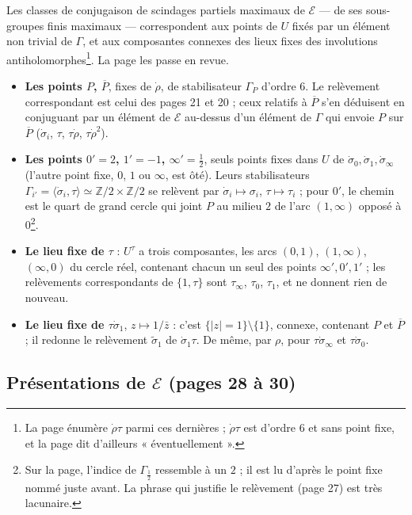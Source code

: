 \documentclass[11pt,a4paper]{article}
\begin{document}
Les classes de conjugaison de scindages partiels maximaux de $\mathcal{E}$ —
de ses sous-groupes finis maximaux — correspondent aux points de $U$ fixés par
un élément non trivial de $\Gamma$, et aux composantes connexes des lieux fixes
des involutions antiholomorphes\footnote{La page énumère $\dot\rho\tau$ parmi
ces dernières ; $\dot\rho\tau$ est d'ordre $6$ et sans point fixe, et la page
dit d'ailleurs « éventuellement ».}. La page les passe en revue.

\begin{itemize}
\item \textbf{Les points $P$, $\overline{P}$}, fixes de $\dot\rho$, de
stabilisateur $\Gamma_P$ d'ordre $6$. Le relèvement correspondant est celui des
pages 21 et 20 ; ceux relatifs à $\overline{P}$ s'en déduisent en conjuguant par
un élément de $\mathcal{E}$ au-dessus d'un élément de $\Gamma$ qui envoie $P$
sur $\overline{P}$ ($\dot\sigma_i$, $\tau$, $\tau\dot\rho$, $\tau\dot\rho^2$).
\item \textbf{Les points $0' = 2$, $1' = -1$, $\infty' = \frac12$}, seuls points
fixes dans $U$ de $\dot\sigma_0, \dot\sigma_1, \dot\sigma_\infty$ (l'autre point
fixe, $0$, $1$ ou $\infty$, est ôté). Leurs stabilisateurs $\Gamma_{i'} =
\langle \dot\sigma_i, \tau\rangle \simeq \mathbb{Z}/2 \times \mathbb{Z}/2$ se
relèvent par $\dot\sigma_i \mapsto \sigma_i$, $\tau \mapsto \tau_i$ ; pour
$0'$, le chemin est le quart de grand cercle qui joint $P$ au milieu $2$ de
l'arc $(1, \infty)$ opposé à $0$\footnote{Sur la page, l'indice de
$\Gamma_{\frac12}$ ressemble à un $2$ ; il est lu d'après le point fixe nommé
juste avant. La phrase qui justifie le relèvement (page 27) est très lacunaire.}.
\item \textbf{Le lieu fixe de $\tau$} : $U^{\tau}$ a trois composantes, les arcs
$(0,1)$, $(1,\infty)$, $(\infty, 0)$ du cercle réel, contenant chacun un seul
des points $\infty', 0', 1'$ ; les relèvements correspondants de $\{1, \tau\}$
sont $\tau_\infty$, $\tau_0$, $\tau_1$, et ne donnent rien de nouveau.
\item \textbf{Le lieu fixe de $\tau\dot\sigma_1$}, $z \mapsto 1/\bar z$ : c'est
$\{|z| = 1\} \setminus \{1\}$, connexe, contenant $P$ et $\overline{P}$ ; il
redonne le relèvement $\tilde\sigma_1$ de $\dot\sigma_1\tau$. De même, par
$\rho$, pour $\tau\dot\sigma_\infty$ et $\tau\dot\sigma_0$.
\end{itemize}

\subsection*{Présentations de $\mathcal{E}$ (pages 28 à 30)}
\end{document}
